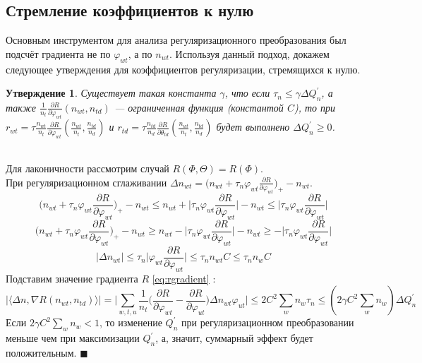 \documentclass[12pt]{article}
\newtheorem{claim}[remark]{Утверждение}
\newenvironment{Proof} 
	{\par\noindent{\bf Доказательство.}} 
	{\hfill$\blacksquare$}
\renewcommand{\leq}{\leqslant}
\renewcommand{\geq}{\geqslant}
\renewcommand{\phi}{\varphi}
\begin{document}
           \subsection{Стремление коэффициентов к нулю}
Основным инструментом для анализа регуляризационного преобразования был подсчёт градиента не по $\phi_{wt}$, а по $n_{wt}$. Используя данный подход, докажем следующее утверждения для коэффициентов регуляризации, стремящихся к нулю.
\begin{claim}
Существует такая константа $\gamma$, что если $\tau_n \leq \gamma \Delta Q^{\prime}_n$, а также $\frac{1}{n_t} \frac{\partial{R}}{\partial{\phi_{wt}}}(n_{wt}, n_{td})$ --- ограниченная функция (константой $C$), то при $r_{wt} = \tau \frac{n_{wt}}{n_t} \frac{\partial{R}}{\partial{\phi_{wt}}} \left(\frac{n_{wt}}{n_t}, \frac{n_{td}}{n_d}\right)$ и $r_{td}= \tau \frac{n_{td}}{n_d} \frac{\partial{R}}{\partial{\theta_{td}}} \left(\frac{n_{wt}}{n_t}, \frac{n_{td}}{n_d}\right)$ будет выполнено $\Delta Q^{\prime}_n \geq 0$.
\end{claim}
\begin{Proof}
\ \\
Для лаконичности рассмотрим случай $R(\Phi, \Theta) = R(\Phi)$. \\
При регуляризационном сглаживании  $\Delta n_{wt} = \bigg( n_{wt} + \tau_n \phi_{wt} \frac{\partial{R}}{\partial{\phi_{wt}}}\bigg)_{+} - n_{wt}$.
\[
\bigg( n_{wt} + \tau_n \phi_{wt} \frac{\partial{R}}{\partial{\phi_{wt}}}\bigg)_{+} - n_{wt} \leq  n_{wt} +\bigg| \tau_n \phi_{wt} \frac{\partial{R}}{\partial{\phi_{wt}}}\bigg| - n_{wt} \leq \bigg| \tau_n \phi_{wt} \frac{\partial{R}}{\partial{\phi_{wt}}}\bigg|
\]
\[
\bigg( n_{wt} + \tau_n \phi_{wt} \frac{\partial{R}}{\partial{\phi_{wt}}}\bigg)_{+} - n_{wt} \geq  n_{wt} - \bigg| \tau_n \phi_{wt} \frac{\partial{R}}{\partial{\phi_{wt}}}\bigg| - n_{wt} \geq - \bigg| \tau_n \phi_{wt} \frac{\partial{R}}{\partial{\phi_{wt}}}\bigg|
\]
\[
|\Delta n_{wt} | \leq \tau_n\bigg|  \phi_{wt} \frac{\partial{R}}{\partial{\phi_{wt}}}\bigg| \leq \tau_n n_{wt} C \leq \tau_n n_{w} C
\]
Подставим значение градиента $R$ \eqref{eq:rgradient} :
\[
 \bigg|\langle\Delta n, \nabla R(n_{wt}, n_{td}) \rangle\bigg| = \bigg| \sum\limits_{w, t, u}  \frac{1}{n_{t}}  \bigg(  \frac{\partial{R}}{\partial{\phi_{wt}}}  -  \frac{\partial{R}}{\partial{\phi_{ut}}}  \bigg)  \Delta n_{wt}  \phi_{ut} \bigg| \leq 2C^2\sum_w n_w  \tau_n \leq (2 \gamma C^2\sum_w n_w) \Delta Q^{\prime}_n
\]
Если $ 2 \gamma C^2 \sum_w n_w < 1$, то изменение $Q^{\prime}_n$ при регуляризационном преобразовании меньше чем при максимизации $Q^{\prime}_n$, а, значит, суммарный эффект будет положительным.
\end{Proof}
\end{document}
